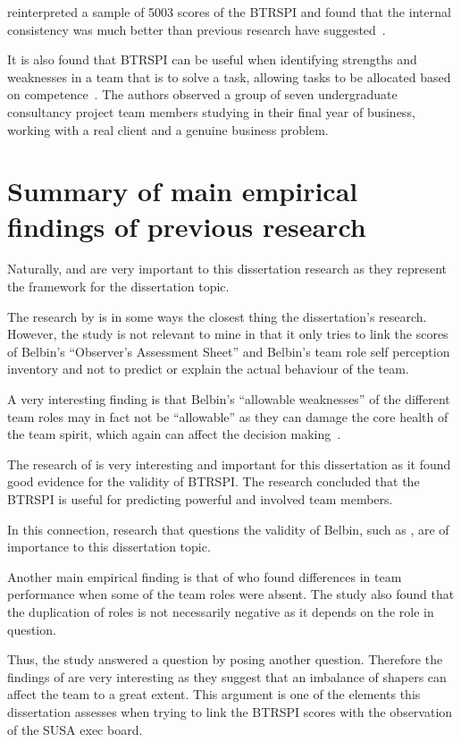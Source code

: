 \documentclass[a4paper,12pt,titlepage]{report}
\begin{document}
  \citet{sstm} reinterpreted a sample of 5003 scores of the BTRSPI and
  found that the internal consistency was much better than previous research
  have suggested~\cite[529-533]{sstm}.

  It is also found that BTRSPI can be useful when identifying
  strengths and weaknesses in a team that is to solve a task, allowing
  tasks to be allocated based on competence~\cite[105]{bwmg}.
  The authors observed a group of seven undergraduate
  consultancy project team members studying in their final year of business,
  working with a real client and a genuine business problem.

  
  \section{Summary of main empirical findings of previous research}
  Naturally, \citet{rmb} and \citet{rmb2} are very important to
  this dissertation research as they represent the framework for the
  dissertation topic.

  The research by \citet{bsss} is in some ways the closest thing the dissertation's
  research. However, the study is not relevant to mine
  in that it only tries to link the scores of Belbin's
  ``Observer's Assessment Sheet'' and Belbin's team role self perception
  inventory and not to predict or explain the actual behaviour of the
  team.

  A very interesting finding is that Belbin's ``allowable weaknesses''
  of the different team roles may in fact not be ``allowable'' as they
  can damage the core health of the team spirit, which again can affect
  the decision making~\cite[362]{wmdh}.

  The research of \citet{sfwmjs} is very interesting and important
  for this dissertation as it found good evidence for the validity of
  BTRSPI. The research concluded that the BTRSPI
  is useful for predicting powerful and involved team members.

  In this connection, research that questions the validity of Belbin, such
  as \citet{cj}, are of importance to this dissertation topic.

  Another main empirical finding is that of \citet{dphh} who found
  differences in team performance when some of the team roles were
  absent. The study also found that the duplication of roles is not necessarily
  negative as it depends on the role in question.

  Thus, the study answered a question by posing another question. Therefore
  the findings of \citet{jpns} are very interesting as they suggest
  that an imbalance of shapers can affect the team to a great extent. This
  argument is one of the elements this dissertation assesses when trying to link
  the BTRSPI scores with the observation of the SUSA exec board.
  
\end{document}
